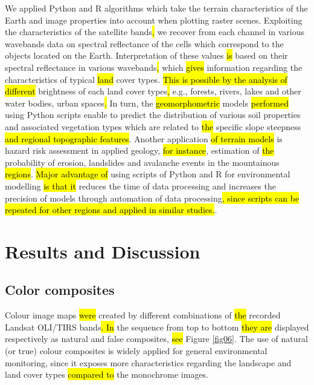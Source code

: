 \documentclass[jimaging,article,submit,pdftex,moreauthors]{Definitions/mdpi}
\begin{document}
We applied\hl{ }Python and R algorithms which take the terrain characteristics of the Earth and image properties into account when plotting raster scenes. Exploiting the characteristics of the satellite bands\hl{, }we recover from each channel in various wavebands data on spectral reflectance of the cells which correspond to the objects located on the Earth. Interpretation of these values \hl{is} based on their spectral reflectance in various wavebands\hl{, }which \hl{gives} information regarding the characteristics of typical \hl{land} cover types. \hl{This is possible by the analysis of different} brightness of each land cover types\hl{, }e.g., forests, rivers, lakes and other water bodies, urban spaces\hl{. }In turn, the \hl{geomorphometric} models \hl{performed} using Python scripts\hl{ }enable to predict the distribution of various soil properties and associated vegetation types which are related to \hl{the} specific slope steepness \hl{and regional topographic features}. Another application \hl{of terrain models} is hazard risk assessment in applied geology, \hl{for instance}, estimation of \hl{the} probability of erosion, landslides and avalanche events in the mountainous \hl{regions}. \hl{Major advantage of} using scripts of Python and R for environmental modelling \hl{is that it} reduces the time of data processing and increases the precision of models through automation of data processing\hl{, since scripts can be repeated for other regions and applied in similar studies.}.

\section{Results and Discussion}
\subsection{Color composites}
Colour image maps \hl{were} created by different combinations of \hl{the} recorded Landsat OLI/TIRS bands\hl{. In} the sequence from top to bottom \hl{they are} displayed respectively as natural and false composites, \hl{see} Figure \ref{fig06}. The use of natural (or true) colour composites is widely applied for general environmental monitoring, since it exposes more characteristics regarding the landscape and land cover types \hl{compared to} the monochrome images. 
\end{document}
